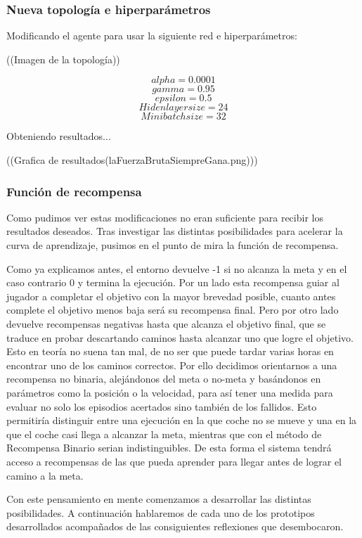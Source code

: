 \subsubsection*{Nueva topología e hiperparámetros}
Modificando el agente para usar la siguiente red e hiperparámetros:

((Imagen de la topología))

$$ alpha = 0.0001$$
$$ gamma = 0.95$$
$$ epsilon = 0.5$$
$$ Hiden layer size = 24$$
$$ Minibatch size = 32 $$

Obteniendo resultados... 

((Grafica de resultados(laFuerzaBrutaSiempreGana.png)))

\subsubsection*{Función de recompensa}
Como pudimos ver estas modificaciones no eran suficiente para recibir los resultados deseados.
Tras investigar las distintas posibilidades para acelerar la curva de aprendizaje, pusimos en el punto de mira la función de recompensa. 

Como ya explicamos antes, el entorno devuelve -1 si no alcanza la meta y en el caso contrario 0 y termina la ejecución. 
Por un lado esta recompensa guiar al jugador a completar el objetivo con la mayor brevedad posible, cuanto antes complete el objetivo menos baja será su recompensa final.
Pero por otro lado devuelve recompensas negativas hasta que alcanza el objetivo final, que se traduce en probar descartando caminos hasta alcanzar uno que logre el objetivo. Esto en teoría no suena tan mal, de no ser que puede tardar varias horas en encontrar uno de los caminos correctos. Por ello decidimos orientarnos a una recompensa no binaria, alejándonos del meta o no-meta y basándonos en parámetros como la posición o la velocidad, para así tener una medida para evaluar no solo los episodios acertados sino también de los fallidos. Esto permitiría distinguir entre una ejecución en la que coche no se mueve y una en la que el coche casi llega a alcanzar la meta, mientras que con el método de Recompensa Binario serian indistinguibles. De esta forma el sistema tendrá acceso a recompensas de las que pueda aprender para llegar antes de lograr el camino a la meta. 

Con este pensamiento en mente comenzamos a desarrollar las distintas posibilidades. A continuación hablaremos de cada uno de los prototipos desarrollados acompañados de las consiguientes reflexiones que desembocaron.
 
